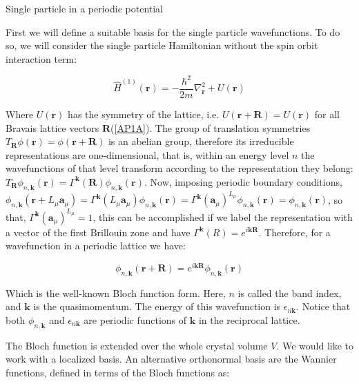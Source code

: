 \begin{section}{Single particle in a periodic potential}

First we will define a suitable basis for the single particle wavefunctions. To do so, we will consider the single particle Hamiltonian without the spin orbit interaction term:

\begin{equation}
\hat{H}^{(1)}(\textbf{r}) = -\frac{\hbar^2}{2m}\nabla^2_{\textbf{r}} + U(\textbf{r})
\end{equation}

Where $U(\textbf{r})$ has the symmetry of the lattice, i.e. $U(\textbf{r} + \textbf{R}) = U(\textbf{r})$ for all Bravais lattice vectors $\textbf{R}$(\ref{AP1A}). The group of translation symmetries $T_{\textbf{R}}\phi(\textbf{r}) = \phi(\textbf{r} + \textbf{R})$ is an abelian group, therefore its irreducible representations are one-dimensional, that is, within an energy level $n$ the wavefunctions of that level transform according to the representation they belong: $T_{\textbf{R}}\phi_{n, \textbf{k}}(\textbf{r}) = \Gamma^{\textbf{k}}(\textbf{R}) \phi_{n, \textbf{k}}(\textbf{r})$. Now, imposing periodic boundary conditions, $\phi_{n, \textbf{k}}(\textbf{r} + L_\mu \textbf{a}_\mu) = \Gamma^{\textbf{k}}(L_\mu \textbf{a}_\mu) \phi_{n, \textbf{k}}(\textbf{r}) = \Gamma^{\textbf{k}}(\textbf{a}_\mu)^{L_\mu} \phi_{n, \textbf{k}}(\textbf{r}) = \phi_{n, \textbf{k}}(\textbf{r})$, so that, $\Gamma^{\textbf{k}}(\textbf{a}_\mu)^{L_\mu} = 1$, this can be accomplished if we label the representation with a vector of the first Brillouin zone and have $\Gamma^{\textbf{k}}(R) = e^{i \textbf{k} \textbf{R}}$. Therefore, for a wavefunction in a periodic lattice we have:

\begin{equation}
\label{Bloch1}
\phi_{n, \textbf{k}}(\textbf{r}+\textbf{R}) = e^{i\textbf{k}\textbf{R}}\phi_{n, \textbf{k}} (\textbf{r})
\end{equation}

Which is the well-known Bloch function form. Here, $n$ is called the band index, and $\textbf{k}$ is the quasimomentum. The energy of this wavefunction is $\epsilon_{n \textbf{k}}$.  Notice that both $\phi_{n,\textbf{k}}$ and $\epsilon_{n \textbf{k}}$ are periodic functions of $\textbf{k}$ in the reciprocal lattice.

The Bloch function is extended over the whole crystal volume $V$. We would like to work with a localized basis. An alternative orthonormal basis are the Wannier functions, defined in terms of the Bloch functions as:


\end{section}
